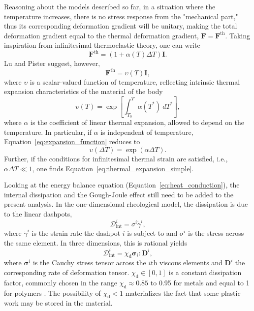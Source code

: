Reasoning about the models described so far, in a situation where the temperature increases, there is no stress response from the "mechanical part," thus its corresponding deformation gradient will be unitary, making the total deformation gradient equal to the thermal deformation gradient, $\mathbf F = \mathbf F^\text{th}$.
Taking inspiration from infinitesimal thermoelastic theory, one can write
\begin{equation}
	\label{eq:thermal_expansion_simple}
	\mathbf F^\text{th} = (1 + \alpha(T)\Delta T)\mathbf I.
\end{equation}
Lu and Pister \citep{luDecompositionDeformationRepresentation1975} suggest, however,
\begin{equation}
	\mathbf F^\text{th} = \upsilon(T)\mathbf I,
\end{equation}
where $\upsilon$ is a scalar-valued function of temperature, reflecting intrinsic thermal expansion characteristics of the material of the body
\begin{equation}
	\label{eq:expansion_function}
	\upsilon(T) = \exp\left[\int_{T_0}^T \alpha(T^*)\ dT^*\right],
\end{equation}
where $\alpha$ is the coefficient of linear thermal expansion, allowed to depend on the temperature.
In particular, if $\alpha$ is independent of temperature, Equation~\ref{eq:expansion_function} reduces to
\begin{equation}
	\upsilon(\Delta T) = \exp(\alpha \Delta T).
\end{equation}
Further, if the conditions for infinitesimal thermal strain are satisfied, i.e., $\alpha\Delta T \ll 1$, one finds Equation~\eqref{eq:thermal_expansion_simple}.

Looking at the energy balance equation (Equation~\eqref{eq:heat_conduction}), the internal dissipation and the Gough-Joule effect still need to be added to the present analysis.
In the one-dimensional rheological model, the dissipation is due to the linear dashpots,
\begin{equation}
	\mathcal D^i_\text{int} = \sigma^i {\dot\gamma}^i,
\end{equation}
where ${\dot \gamma}^i$ is the strain rate the dashpot $i$ is subject to and $\sigma^i$ is the stress across the same element.
In three dimensions, this is rational yields
\begin{equation}
	\mathcal D_\text{int}^i = \chi_\text{d}\mathbf \sigma_i : \mathbf D^i,
\end{equation}
where $\bm \sigma^i$ is the Cauchy stress tensor across the $i$th viscous elements and $\mathbf D^i$ the corresponding rate of deformation tensor.
$\chi_\text{d}\in [0, 1]$ is a constant dissipation factor, commonly chosen in the range $\chi_\text{d}\approx 0.85$ to 0.95 for metals \citep{simoAssociativeCoupledThermoplasticity1992} and equal to 1 for polymers \citep{okerekeTwoprocessConstitutiveModel2019, haoRatedependentConstitutiveModel2022}.
The possibility of $\chi_\text{d}<1$ materializes the fact that some plastic work may be stored in the material.

